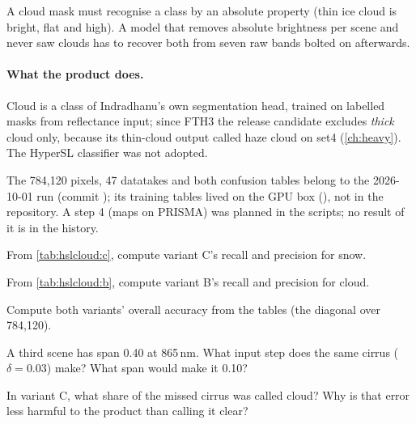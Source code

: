 \begin{keypoint}
A cloud mask must recognise a class by an absolute property (thin ice cloud is bright, flat and high). A model that
removes absolute brightness per scene and never saw clouds has to recover both from seven raw bands bolted on afterwards.
\end{keypoint}

\paragraph{What the product does.} Cloud is a class of Indradhanu's own segmentation head, trained on labelled masks from
reflectance input; since FTH3 the release candidate excludes \emph{thick} cloud only, because its thin-cloud output called
haze cloud on set4 (\cref{ch:heavy}). The HyperSL classifier was not adopted.

\begin{drift}
The 784,120 pixels, 47 datatakes and both confusion tables belong to the 2026-10-01 run (commit ); its
training tables lived on the GPU box (), not in the repository. A step 4 (maps on PRISMA) was planned
in the scripts; no result of it is in the history.
\end{drift}

\begin{confusions}
\end{confusions}

\begin{checkyourself}
\item\label{ex:hslcloud:1} From \cref{tab:hslcloud:c}, compute variant C's recall and precision for snow.
\item\label{ex:hslcloud:2} From \cref{tab:hslcloud:b}, compute variant B's recall and precision for cloud.
\item\label{ex:hslcloud:3} Compute both variants' overall accuracy from the tables (the diagonal over 784,120).
\item\label{ex:hslcloud:4} A third scene has span 0.40 at 865\,nm. What input step does the same cirrus ($\delta=0.03$) make?
  What span would make it 0.10?
\item\label{ex:hslcloud:5} In variant C, what share of the missed cirrus was called cloud? Why is that error less harmful to the
  product than calling it clear?
\end{checkyourself}

